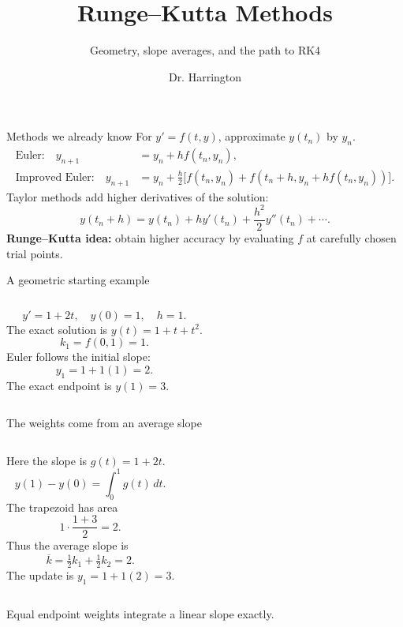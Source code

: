\documentclass[aspectratio=169]{beamer}
\title{Runge--Kutta Methods}
\subtitle{Geometry, slope averages, and the path to RK4}
\author{Dr. Harrington}
\institute{MAD 4401 --- University of Florida}
\date{}
\newcommand{\axes}{
\draw[->] (-.08,.75)--(1.25,.75) node[right]{$t$};
\draw[->] (0,.75)--(0,3.2) node[above]{$y$};
\foreach \x in {.5,1}{\draw (\x,.72)--(\x,.78) node[below=3pt] {\scriptsize\x};}
\foreach \y in {1,2,3}{\draw (-.015,\y)--(.015,\y) node[left=3pt]{\scriptsize\y};}
\draw[gray,dotted] (1,.8)--(1,3.05);
}
\begin{document}
\frame{\titlepage}
\begin{frame}{Methods we already know}
For $y'=f(t,y)$, approximate $y(t_n)$ by $y_n$.
\begin{align*}
\text{Euler:}\quad y_{n+1}&=y_n+h f(t_n,y_n),\\
\text{Improved Euler:}\quad y_{n+1}&=y_n+\frac h2\bigl[f(t_n,y_n)+f(t_n+h,y_n+hf(t_n,y_n))\bigr].
\end{align*}
Taylor methods add higher derivatives of the solution:
\[y(t_n+h)=y(t_n)+hy'(t_n)+\frac{h^2}{2}y''(t_n)+\cdots.\]
\textbf{Runge--Kutta idea:} obtain higher accuracy by evaluating $f$ at carefully chosen trial points.
\end{frame}
\begin{frame}{A geometric starting example}
\begin{columns}
\[y'=1+2t,\quad y(0)=1,\quad h=1.\]
The exact solution is $y(t)=1+t+t^2$.
\[k_1=f(0,1)=1.\]
Euler follows the initial slope:
\[y_1=1+1(1)=2.\]
The exact endpoint is $y(1)=3$.
\end{columns}
\end{frame}
\begin{frame}{The weights come from an average slope}
\begin{columns}
Here the slope is $g(t)=1+2t$.
\[y(1)-y(0)=\int_0^1g(t)\,dt.\]
The trapezoid has area
\[1\cdot\frac{1+3}{2}=2.\]
Thus the average slope is
\[\boxed{\overline{k}=\tfrac12 k_1+\tfrac12 k_2=2}.\]
The update is $y_1=1+1(2)=3$.
\end{columns}
\medskip
Equal endpoint weights integrate a linear slope exactly.
\end{frame}
\end{document}
